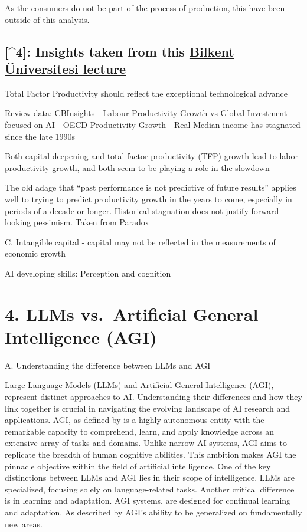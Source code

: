 \documentclass[preprint, 3p,
authoryear]{elsarticle} %
\begin{document}
As the consumers do not be part of the process of production, this have
been outside of this analysis.

\hypertarget{insights-taken-from-this-bilkent-uxfcniversitesi-lecture}{%
\subsection{\texorpdfstring{{[}\^{}4{]}: Insights taken from this
\href{https://youtu.be/m3nkTrFF2zs?si=dgPJlvVgQuuQAcL8}{Bilkent
Üniversitesi
lecture}}{{[}\^{}4{]}: Insights taken from this Bilkent Üniversitesi lecture}}\label{insights-taken-from-this-bilkent-uxfcniversitesi-lecture}}

Total Factor Productivity should reflect the exceptional technological
advance

Review data: CBInsights - Labour Productivity Growth vs Global
Investment focused on AI - OECD Productivity Growth - Real Median income
has stagnated since the late 1990s

Both capital deepening and total factor productivity (TFP) growth lead
to labor productivity growth, and both seem to be playing a role in the
slowdown

The old adage that ``past performance is not predictive of future
results'' applies well to trying to predict productivity growth in the
years to come, especially in periods of a decade or longer. Historical
stagnation does not justify forward-looking pessimism. Taken from
Paradox

C. Intangible capital - capital may not be reflected in the measurements
of economic growth

AI developing skills: Perception and cognition

\hypertarget{llms-vs.-artificial-general-intelligence-agi}{%
\section{4. LLMs vs.~Artificial General Intelligence
(AGI)}\label{llms-vs.-artificial-general-intelligence-agi}}

A. Understanding the difference between LLMs and AGI

Large Language Models (LLMs) and Artificial General Intelligence (AGI),
represent distinct approaches to AI. Understanding their differences and
how they link together is crucial in navigating the evolving landscape
of AI research and applications. AGI, as defined by
\citep{Zhou2023PathTM} is a highly autonomous entity with the remarkable
capacity to comprehend, learn, and apply knowledge across an extensive
array of tasks and domains. Unlike narrow AI systems, AGI aims to
replicate the breadth of human cognitive abilities. This ambition makes
AGI the pinnacle objective within the field of artificial intelligence.
One of the key distinctions between LLMs and AGI lies in their scope of
intelligence. LLMs are specialized, focusing solely on language-related
tasks. Another critical difference is in learning and adaptation. AGI
systems, are designed for continual learning and adaptation. As
described by \citep{Wang2012Chapter1I} AGI's ability to be generalized
on fundamentally new areas.
\end{document}
